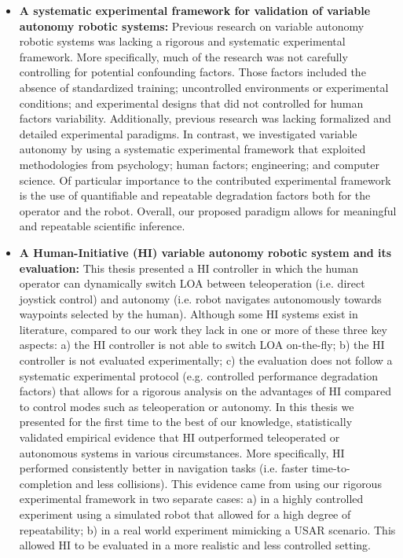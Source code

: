 \documentclass[a4paper,12pt,oneside,openright]{bhamthesis}
\begin{document}
\begin{itemize}

	\item \textbf{A systematic experimental framework for validation of variable autonomy robotic systems:} Previous research on variable autonomy robotic systems was lacking a rigorous and systematic experimental framework. More specifically, much of the research was not carefully controlling for potential confounding factors. Those factors included the absence of standardized training; uncontrolled environments or experimental conditions; and experimental designs that did not controlled for human factors variability. Additionally, previous research was lacking formalized and detailed experimental paradigms. In contrast, we investigated variable autonomy by using a systematic experimental framework that exploited methodologies from psychology; human factors; engineering; and computer science. Of particular importance to the contributed experimental framework is the use of quantifiable and repeatable degradation factors both for the operator and the robot. Overall, our proposed paradigm allows for meaningful and repeatable scientific inference. 
    
	
	\item \textbf{A Human-Initiative (HI) variable autonomy robotic system and its evaluation:} This thesis presented a HI controller in which the human operator can dynamically switch LOA between teleoperation (i.e. direct joystick control) and autonomy (i.e. robot navigates autonomously towards waypoints selected by the human). Although some HI systems exist in literature, compared to our work they lack in one or more of these three key aspects: a) the HI controller is not able to switch LOA on-the-fly; b) the HI controller is not evaluated experimentally; c) the evaluation does not follow a systematic experimental protocol (e.g. controlled performance degradation factors) that allows for a rigorous analysis on the advantages of HI compared to control modes such as teleoperation or autonomy. In this thesis we presented for the first time to the best of our knowledge, statistically validated empirical evidence that HI outperformed teleoperated or autonomous systems in various circumstances. More specifically, HI performed consistently better in navigation tasks (i.e. faster time-to-completion and less collisions). This evidence came from using our rigorous experimental framework in two separate cases: a) in a highly controlled experiment using a simulated robot that allowed for a high degree of repeatability; b) in a real world experiment mimicking a USAR scenario. This allowed HI to be evaluated in a more realistic and less controlled setting.
    

\end{itemize}
\end{document}
